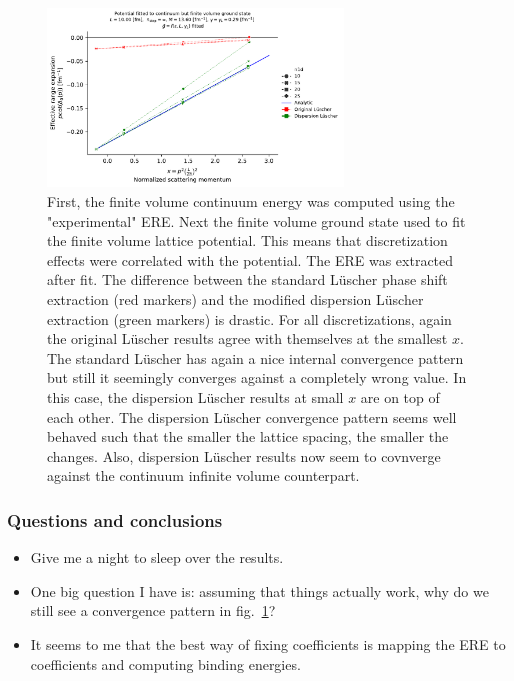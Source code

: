 \documentclass[
    aps,
    prl,
    showkeys,
    nofootinbib,
    floatfix
]{revtex4-1}
\begin{document}
\begin{figure}[!htb]
\includegraphics[width=0.7\textwidth]{figs/long-range-ere-v-lat.pdf}
\caption{
	\label{fig:long-range-ere-v-lat}
	First, the finite volume continuum energy was computed using the "experimental" ERE.
	Next the finite volume ground state used to fit the finite volume lattice potential.
	This means that discretization effects were correlated with the potential.
	The ERE was extracted after fit.
	The difference between the standard Lüscher phase shift extraction (red markers) and the modified dispersion Lüscher extraction (green markers) is drastic.
	For all discretizations, again the original Lüscher results agree with themselves at the smallest $x$.
	The standard Lüscher has again a nice internal convergence pattern but still it seemingly converges against a completely wrong value.
	In this case, the dispersion Lüscher results at small $x$ are on top of each other.
	The dispersion Lüscher convergence pattern seems well behaved such that the smaller the lattice spacing, the smaller the changes.
	Also, dispersion Lüscher results now seem to covnverge against the continuum infinite volume counterpart.
}
\end{figure}

\subsubsection{Questions and conclusions}

\begin{itemize}
	\item Give me a night to sleep over the results.
	\item One big question I have is: assuming that things actually work, why do we still see a convergence pattern in fig.~\ref{fig:long-range-ere-v-lat}?
	\item It seems to me that the best way of fixing coefficients is mapping the ERE to coefficients and computing binding energies.
\end{itemize}
\end{document}
